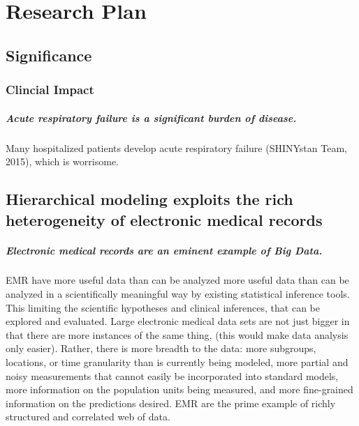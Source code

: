 \documentclass[]{article}
\title{}
\author{}
\date{}
\begin{document}
\maketitle


\section{Research Plan}\label{research-plan}

\subsection{Significance}\label{significance}

\subsubsection{Clincial Impact}\label{clincial-impact}

\subparagraph{Acute respiratory failure is a significant burden of
disease.}\label{acute-respiratory-failure-is-a-significant-burden-of-disease.}

Many hospitalized patients develop acute respiratory failure (SHINYstan
Team, 2015), which is worrisome.

\subsection{Hierarchical modeling exploits the rich heterogeneity of
electronic medical
records}\label{hierarchical-modeling-exploits-the-rich-heterogeneity-of-electronic-medical-records}

\subparagraph{Electronic medical records are an eminent example of Big
Data.}\label{electronic-medical-records-are-an-eminent-example-of-big-data.}

EMR have more useful data than can be analyzed more useful data than can
be analyzed in a scientifically meaningful way by existing statistical
inference tools. This limiting the scientific hypotheses and clinical
inferences, that can be explored and evaluated. Large electronic medical
data sets are not just bigger in that there are more instances of the
same thing, (this would make data analysis only easier). Rather, there
is more breadth to the data: more subgroups, locations, or time
granularity than is currently being modeled, more partial and noisy
measurements that cannot easily be incorporated into standard models,
more information on the population units being measured, and more
fine-grained information on the predictions desired. EMR are the prime
example of richly structured and correlated web of data.
\end{document}

